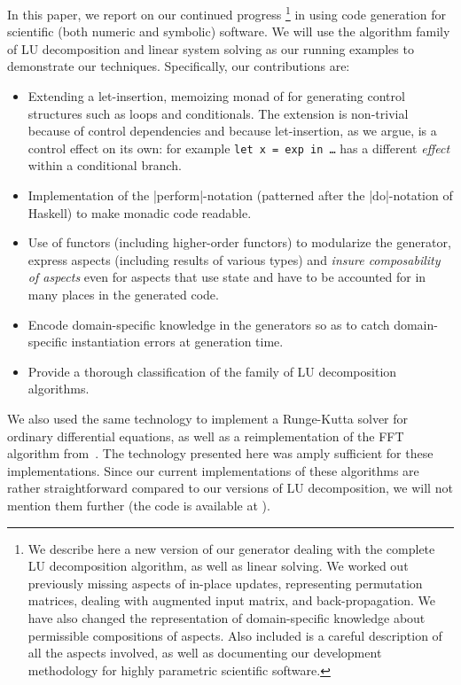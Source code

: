 \documentclass{elsart}
\begin{document}
In this paper, we report on our continued progress \cite{CaretteKiselyov05}%
\footnote{We describe here a new version of our generator
  dealing with the complete LU decomposition algorithm, as well as
  linear solving. We worked out previously missing aspects of in-place
  updates, representing permutation matrices, dealing with augmented 
  input matrix, and back-propagation. We have also changed the representation
  of domain-specific knowledge about permissible compositions of aspects.
  Also included is a careful description of all the aspects involved, as
  well as documenting our development methodology for highly parametric
  scientific software.}
in using code generation for scientific (both numeric and symbolic)
software.  We will use the algorithm family of LU decomposition 
and linear system solving as our running examples to demonstrate our
techniques.  Specifically, our contributions are:
\begin{itemize}
    \item Extending a let-insertion, memoizing monad of
      \cite{KiselyovTaha,SwadiMonadic06} for generating control structures
      such as loops and conditionals. The extension is non-trivial
      because of control dependencies and because let-insertion, as we argue,
      is a control effect on its own: for example
      \texttt{let x = exp in \dots} has a different \emph{effect} within a
      conditional branch.
    \item Implementation of the |perform|-notation (patterned after
      the |do|-notation of Haskell) to make monadic code readable.
    \item Use of functors (including higher-order functors) to
      modularize the generator, express aspects (including results of
      various types) and \emph{insure composability of aspects} even
      for aspects that use state and have to be accounted for in many
      places in the generated code.
    \item Encode domain-specific knowledge in the generators so as to
      catch domain-specific instantiation errors at generation
      time.
    \item Provide a thorough classification of the family of LU decomposition
      algorithms.
\end{itemize}

We also used the same technology to implement a Runge-Kutta solver for
ordinary differential equations, as well as a reimplementation of
the FFT algorithm from~\cite{KiselyovTaha}.  The technology presented
here was amply sufficient for these implementations.  Since our current
implementations of these algorithms are rather straightforward compared to 
our versions of LU decomposition, we will not mention them further 
(the code is available at \cite{metamonadsURL}).
\end{document}
